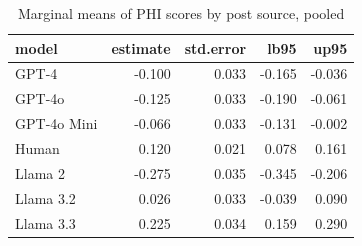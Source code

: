 \begin{table}

\caption{Marginal means of PHI scores by post source, pooled}
\centering
\begin{tabular}[t]{lrrrr}
\toprule
model & estimate & std.error & lb95 & up95\\
\midrule
GPT-4 & -0.100 & 0.033 & -0.165 & -0.036\\
GPT-4o & -0.125 & 0.033 & -0.190 & -0.061\\
GPT-4o Mini & -0.066 & 0.033 & -0.131 & -0.002\\
Human & 0.120 & 0.021 & 0.078 & 0.161\\
Llama 2 & -0.275 & 0.035 & -0.345 & -0.206\\
\addlinespace
Llama 3.2 & 0.026 & 0.033 & -0.039 & 0.090\\
Llama 3.3 & 0.225 & 0.034 & 0.159 & 0.290\\
\bottomrule
\end{tabular}
\end{table}
